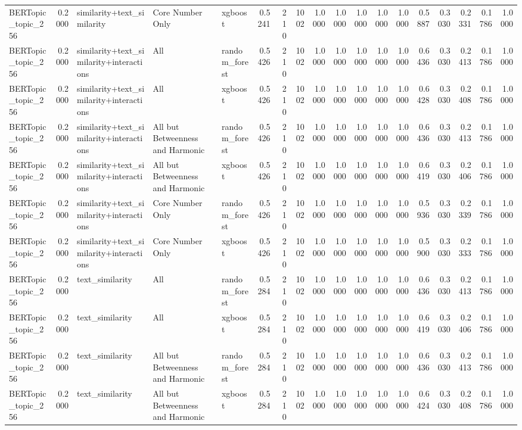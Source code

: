 \begin{tabular}{lrlllrrrrrrrrrrrrr}
BERTopic_topic_256 & 0.2000 & similarity+text_similarity & Core Number Only & xgboost & 0.5241 & 210 & 1002 & 1.0000 & 1.0000 & 1.0000 & 1.0000 & 1.0000 & 0.5887 & 0.3030 & 0.2331 & 0.1786 & 1.0000 \\
BERTopic_topic_256 & 0.2000 & similarity+text_similarity+interactions & All & random_forest & 0.5426 & 210 & 1002 & 1.0000 & 1.0000 & 1.0000 & 1.0000 & 1.0000 & 0.6436 & 0.3030 & 0.2413 & 0.1786 & 1.0000 \\
BERTopic_topic_256 & 0.2000 & similarity+text_similarity+interactions & All & xgboost & 0.5426 & 210 & 1002 & 1.0000 & 1.0000 & 1.0000 & 1.0000 & 1.0000 & 0.6428 & 0.3030 & 0.2408 & 0.1786 & 1.0000 \\
BERTopic_topic_256 & 0.2000 & similarity+text_similarity+interactions & All but Betweenness and Harmonic & random_forest & 0.5426 & 210 & 1002 & 1.0000 & 1.0000 & 1.0000 & 1.0000 & 1.0000 & 0.6436 & 0.3030 & 0.2413 & 0.1786 & 1.0000 \\
BERTopic_topic_256 & 0.2000 & similarity+text_similarity+interactions & All but Betweenness and Harmonic & xgboost & 0.5426 & 210 & 1002 & 1.0000 & 1.0000 & 1.0000 & 1.0000 & 1.0000 & 0.6419 & 0.3030 & 0.2406 & 0.1786 & 1.0000 \\
BERTopic_topic_256 & 0.2000 & similarity+text_similarity+interactions & Core Number Only & random_forest & 0.5426 & 210 & 1002 & 1.0000 & 1.0000 & 1.0000 & 1.0000 & 1.0000 & 0.5936 & 0.3030 & 0.2339 & 0.1786 & 1.0000 \\
BERTopic_topic_256 & 0.2000 & similarity+text_similarity+interactions & Core Number Only & xgboost & 0.5426 & 210 & 1002 & 1.0000 & 1.0000 & 1.0000 & 1.0000 & 1.0000 & 0.5900 & 0.3030 & 0.2333 & 0.1786 & 1.0000 \\
BERTopic_topic_256 & 0.2000 & text_similarity & All & random_forest & 0.5284 & 210 & 1002 & 1.0000 & 1.0000 & 1.0000 & 1.0000 & 1.0000 & 0.6436 & 0.3030 & 0.2413 & 0.1786 & 1.0000 \\
BERTopic_topic_256 & 0.2000 & text_similarity & All & xgboost & 0.5284 & 210 & 1002 & 1.0000 & 1.0000 & 1.0000 & 1.0000 & 1.0000 & 0.6419 & 0.3030 & 0.2406 & 0.1786 & 1.0000 \\
BERTopic_topic_256 & 0.2000 & text_similarity & All but Betweenness and Harmonic & random_forest & 0.5284 & 210 & 1002 & 1.0000 & 1.0000 & 1.0000 & 1.0000 & 1.0000 & 0.6436 & 0.3030 & 0.2413 & 0.1786 & 1.0000 \\
BERTopic_topic_256 & 0.2000 & text_similarity & All but Betweenness and Harmonic & xgboost & 0.5284 & 210 & 1002 & 1.0000 & 1.0000 & 1.0000 & 1.0000 & 1.0000 & 0.6424 & 0.3030 & 0.2408 & 0.1786 & 1.0000 \\

\end{tabular}
